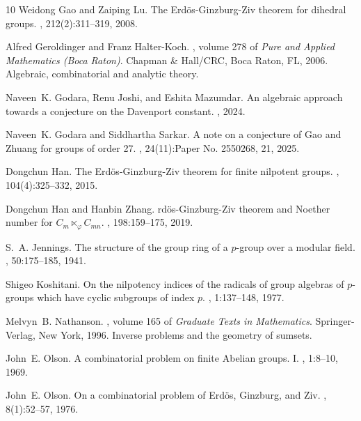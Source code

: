 \documentclass[a4paper,11pt]{article}
\numberwithin{equation}{section}
\begin{document}
\begin{thebibliography}{10}
Weidong Gao and Zaiping Lu.
\newblock The {E}rd\"{o}s-{G}inzburg-{Z}iv theorem for dihedral groups.
, 212(2):311--319, 2008.

Alfred Geroldinger and Franz Halter-Koch.
, volume 278 of {\em Pure and Applied Mathematics (Boca Raton)}.
\newblock Chapman \& Hall/CRC, Boca Raton, FL, 2006.
\newblock Algebraic, combinatorial and analytic theory.

Naveen~K. Godara, Renu Joshi, and Eshita Mazumdar.
\newblock An algebraic approach towards a conjecture on the {D}avenport constant.
, 2024.

Naveen~K. Godara and Siddhartha Sarkar.
\newblock A note on a conjecture of {G}ao and {Z}huang for groups of order 27.
, 24(11):Paper No. 2550268, 21, 2025.

Dongchun Han.
\newblock The {E}rd\"{o}s-{G}inzburg-{Z}iv theorem for finite nilpotent groups.
, 104(4):325--332, 2015.

Dongchun Han and Hanbin Zhang.
rd\"{o}s-{G}inzburg-{Z}iv theorem and {N}oether number for {$C_m\ltimes_\varphi C_{mn}$}.
, 198:159--175, 2019.

S.~A. Jennings.
\newblock The structure of the group ring of a {$p$}-group over a modular field.
, 50:175--185, 1941.

Shigeo Koshitani.
\newblock On the nilpotency indices of the radicals of group algebras of {$p$}-groups which have cyclic subgroups of index {$p$}.
, 1:137--148, 1977.

Melvyn~B. Nathanson.
, volume 165 of {\em Graduate Texts in Mathematics}.
\newblock Springer-Verlag, New York, 1996.
\newblock Inverse problems and the geometry of sumsets.

John~E. Olson.
\newblock A combinatorial problem on finite {A}belian groups. {I}.
, 1:8--10, 1969.

John~E. Olson.
\newblock On a combinatorial problem of {E}rd\"{o}s, {G}inzburg, and {Z}iv.
, 8(1):52--57, 1976.


\end{thebibliography}
\end{document}
